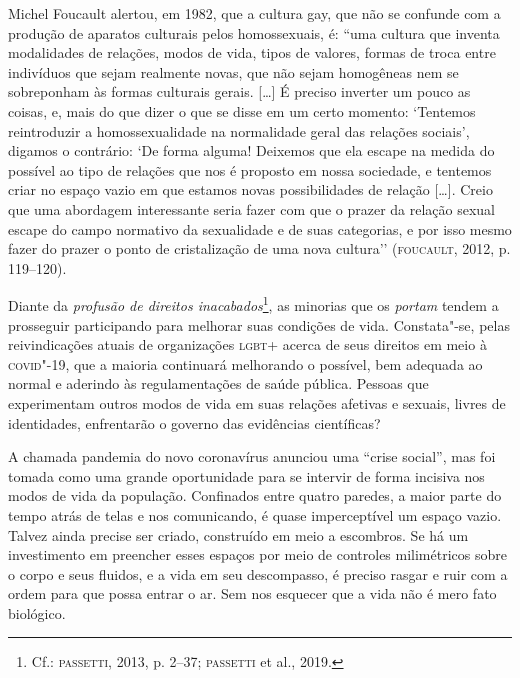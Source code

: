 Michel Foucault alertou, em 1982, que a cultura gay, que não se confunde
com a produção de aparatos culturais pelos homossexuais, é: ``uma
cultura que inventa modalidades de relações, modos de vida, tipos de
valores, formas de troca entre indivíduos que sejam realmente novas, que
não sejam homogêneas nem se sobreponham às formas culturais gerais.
{[}\ldots{}{]} É preciso inverter um pouco as coisas, e, mais do que dizer o
que se disse em um certo momento: `Tentemos reintroduzir a
homossexualidade na normalidade geral das relações sociais', digamos o
contrário: `De forma alguma! Deixemos que ela escape na medida do
possível ao tipo de relações que nos é proposto em nossa sociedade, e
tentemos criar no espaço vazio em que estamos novas possibilidades de
relação {[}\ldots{}{]}. Creio que uma abordagem interessante seria fazer com
que o prazer da relação sexual escape do campo normativo da sexualidade
e de suas categorias, e por isso mesmo fazer do prazer o ponto de
cristalização de uma nova cultura'' (\textsc{foucault}, 2012, p. 119--120).

Diante da \emph{profusão de direitos inacabados}\footnote{Cf.: \textsc{passetti},
  2013, p. 2--37; \textsc{passetti} et al., 2019.}, as minorias que os
\emph{portam} tendem a prosseguir participando para melhorar suas
condições de vida. Constata"-se, pelas reivindicações atuais de
organizações \textsc{lgbt}+ acerca de seus direitos em meio à \textsc{covid}"-19, que a
maioria continuará melhorando o possível, bem adequada ao normal e
aderindo às regulamentações de saúde pública. Pessoas que experimentam
outros modos de vida em suas relações afetivas e sexuais, livres de
identidades, enfrentarão o governo das evidências científicas?

A chamada pandemia do novo coronavírus anunciou uma ``crise social'',
mas foi tomada como uma grande oportunidade para se intervir de forma
incisiva nos modos de vida da população. Confinados entre quatro
paredes, a maior parte do tempo atrás de telas e nos comunicando, é
quase imperceptível um espaço vazio. Talvez ainda precise ser criado,
construído em meio a escombros. Se há um investimento em preencher esses
espaços por meio de controles milimétricos sobre o corpo e seus fluidos,
e a vida em seu descompasso, é preciso rasgar e ruir com a ordem para
que possa entrar o ar. Sem nos esquecer que a vida não é mero fato
biológico.

